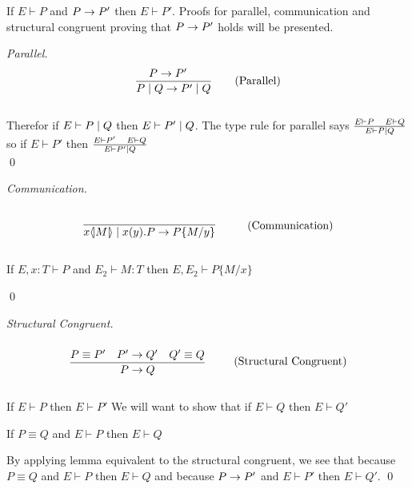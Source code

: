 \begin{theorem}
    If \ensuremath{E \vdash P} and \ensuremath{P\ra P'} then \ensuremath{E \vdash P'}.
    Proofs for parallel, communication and structural congruent proving that \ensuremath{P \ra P'} holds will be presented.\\

    \begin{proof}[Parallel]
        \begin{align*}
            \frac{P \rightarrow P' \quad}{P \mid Q \rightarrow P' \mid Q} \tag{Parallel}
        \end{align*}\\

    Therefor if \ensuremath{E \vdash P \para Q} then \ensuremath{E \vdash P' \para Q}. The type rule for parallel says \ensuremath{\frac{E \vdash P\quad E \vdash Q}{E \vdash P \para Q}} so if \ensuremath{E \vdash P'} then \ensuremath{\frac{E \vdash P' \quad E \vdash Q}{E \vdash P' \para Q}}\\
        \qed
    \end{proof}

    \begin{proof}[Communication]
        \begin{align*}
            \infrule{}{\lift{x}{M}\para\inp{x}{y}P\ra P\{M/y\}} \tag{Communication}
        \end{align*}

        \begin{lemma}[Substitution]
            If \ensuremath{E,x:T \vdash P} and \ensuremath{E_2 \vdash M:T} then \ensuremath{E, E_2 \vdash P\{M/x \}}
        \end{lemma}
        \qed
    \end{proof}

    \begin{proof}[Structural Congruent]
        \begin{align*}
            \infrule{P \equiv P' \quad P' \ra Q' \quad Q' \equiv Q}{P \ra Q} \tag{Structural Congruent}
        \end{align*}

        If \ensuremath{E \vdash P} then \ensuremath{E \vdash P'} We will want to show that if \ensuremath{E \vdash Q} then \ensuremath{E \vdash Q'}

        \begin{lemma}[Equivalent]
            If \ensuremath{P \equiv Q} and \ensuremath{E \vdash P} then \ensuremath{E \vdash Q}
        \end{lemma}

        By applying lemma equivalent to the structural congruent, we see that because \ensuremath{P \equiv Q} and \ensuremath{E \vdash P} then \ensuremath{E \vdash Q} and because \ensuremath{P \ra P'} and \ensuremath{E \vdash P'} then \ensuremath{E \vdash Q'}.
        \qed
    \end{proof}
\end{theorem}
\newpage

